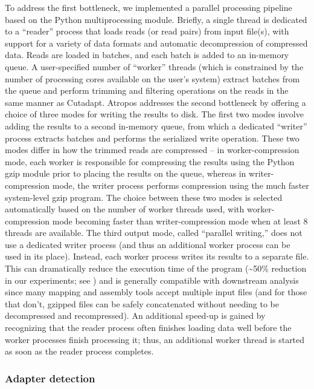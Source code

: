 \documentclass[fleqn,10pt,lineno]{wlpeerj} %
\begin{document}
To address the first bottleneck, we implemented a parallel processing pipeline based on the Python multiprocessing module. Briefly, a single thread is dedicated to a ``reader'' process that loads reads (or read pairs) from input file(s), with support for a variety of data formats and automatic decompression of compressed data. Reads are loaded in batches, and each batch is added to an in-memory queue. A user-specified number of ``worker'' threads (which is constrained by the number of processing cores available on the user's system) extract batches from the queue and perform trimming and filtering operations on the reads in the same manner as Cutadapt. Atropos addresses the second bottleneck by offering a choice of three modes for writing the results to disk. The first two modes involve adding the results to a second in-memory queue, from which a dedicated ``writer'' process extracts batches and performs the serialized write operation. These two modes differ in how the trimmed reads are compressed -- in worker-compression mode, each worker is responsible for compressing the results using the Python gzip module prior to placing the results on the queue, whereas in writer-compression mode, the writer process performs compression using the much faster system-level gzip program. The choice between these two modes is selected automatically based on the number of worker threads used, with worker-compression mode becoming faster than writer-compression mode when at least 8 threads are available. The third output mode, called ``parallel writing,'' does not use a dedicated writer process (and thus an additional worker process can be used in its place). Instead, each worker process writes its results to a separate file. This can dramatically reduce the execution time of the program (\textasciitilde50\% reduction in our experiments; see ) and is generally compatible with downstream analysis since many mapping and assembly tools accept multiple input files (and for those that don't, gzipped files can be safely concatenated without needing to be decompressed and recompressed). An additional speed-up is gained by recognizing that the reader process often finishes loading data well before the worker processes finish processing it; thus, an additional worker thread is started as soon as the reader process completes.

\subsubsection{Adapter detection}
\end{document}
